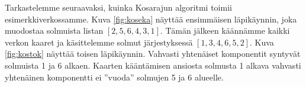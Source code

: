 Tarkastelemme seuraavaksi, kuinka Kosarajun algoritmi
toimii esimerkkiverkossamme.
Kuva \ref{fig:koseka} näyttää ensimmäisen läpikäynnin,
joka muodostaa solmuista listan $[2,5,6,4,3,1]$.
Tämän jälkeen käännämme kaikki verkon kaaret ja
käsittelemme solmut järjestyksessä $[1,3,4,6,5,2]$.
Kuva \ref{fig:kostok} näyttää toisen läpikäynnin.
Vahvasti yhtenäiset komponentit syntyvät
solmuista 1 ja 6 alkaen.
Kaarten kääntämisen ansiosta
solmusta 1 alkava
vahvasti yhtenäinen komponentti ei ''vuoda''
solmujen 5 ja 6 alueelle.

\begin{figure}
\center
\begin{center}
\end{center}
\end{figure}
